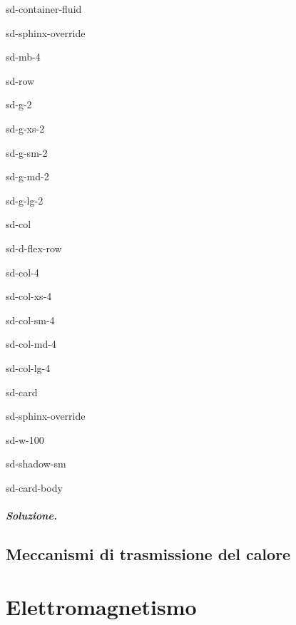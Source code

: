 \documentclass[letterpaper,10pt,italian]{jupyterBook}
\begin{document}
\begin{sphinxuseclass}{sd-container-fluid}
\begin{sphinxuseclass}{sd-sphinx-override}
\begin{sphinxuseclass}{sd-mb-4}
\begin{sphinxuseclass}{sd-row}
\begin{sphinxuseclass}{sd-g-2}
\begin{sphinxuseclass}{sd-g-xs-2}
\begin{sphinxuseclass}{sd-g-sm-2}
\begin{sphinxuseclass}{sd-g-md-2}
\begin{sphinxuseclass}{sd-g-lg-2}
\begin{sphinxuseclass}{sd-col}
\begin{sphinxuseclass}{sd-d-flex-row}
\begin{sphinxuseclass}{sd-col-4}
\begin{sphinxuseclass}{sd-col-xs-4}
\begin{sphinxuseclass}{sd-col-sm-4}
\begin{sphinxuseclass}{sd-col-md-4}
\begin{sphinxuseclass}{sd-col-lg-4}
\begin{sphinxuseclass}{sd-card}
\begin{sphinxuseclass}{sd-sphinx-override}
\begin{sphinxuseclass}{sd-w-100}
\begin{sphinxuseclass}{sd-shadow-sm}
\begin{sphinxuseclass}{sd-card-body}
\end{sphinxuseclass}
\end{sphinxuseclass}
\end{sphinxuseclass}
\end{sphinxuseclass}
\end{sphinxuseclass}
\end{sphinxuseclass}
\end{sphinxuseclass}
\end{sphinxuseclass}
\end{sphinxuseclass}
\end{sphinxuseclass}
\end{sphinxuseclass}
\end{sphinxuseclass}
\end{sphinxuseclass}
\end{sphinxuseclass}
\end{sphinxuseclass}
\end{sphinxuseclass}
\end{sphinxuseclass}
\end{sphinxuseclass}
\end{sphinxuseclass}
\end{sphinxuseclass}
\end{sphinxuseclass}\subsubsection*{Soluzione.}

\sphinxstepscope


\chapter{Meccanismi di trasmissione del calore}
\label{\detokenize{ch/thermodynamics/heat-transmission:meccanismi-di-trasmissione-del-calore}}\label{\detokenize{ch/thermodynamics/heat-transmission:physics-hs-thermodynamics-heat-transmission}}\label{\detokenize{ch/thermodynamics/heat-transmission::doc}}
\sphinxstepscope


\part{Elettromagnetismo}

\sphinxstepscope
\end{document}
